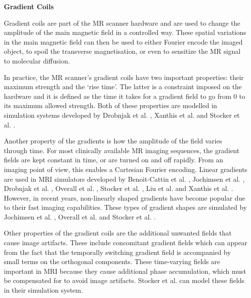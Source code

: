 \hfill

\large \textbf{Gradient Coils} \normalsize

Gradient coils are part of the MR scanner hardware and are used to change the amplitude of the main magnetic field in a controlled way.
These spatial variations in the main magnetic field can then be used 
to either Fourier encode the imaged object, 
to spoil the transverse magnetisation, or even
to sensitize the MR signal to molecular diffusion.

\hfill
    
In practice, the MR scanner's gradient coils have two important properties: their maximum strength and the `rise time'.
The latter is a constraint imposed on the hardware and it is defined as the time it takes for a gradient field to go from 0 to its maximum allowed strength.
Both of these properties are modelled in simulation systems developed by Drobnjak et al. \cite{Drobnjak2006}, Xanthis et al. \cite{Xanthis2014} and Stocker et al. \cite{Stocker2010}.

\hfill

Another property of the gradients is how the amplitude of the field varies through time.
For most clinically available MR imaging sequences, the gradient fields are kept constant in time, or are turned on and off rapidly.
From an imaging point of view, this enables a Cartesian Fourier encoding.
Linear gradients are used in MRI simulators developed by
Benoit-Cattin et al. \cite{Benoit-Cattin2005},
Jochimsen et al. \cite{Jochimsen2004},
Drobnjak et al. \cite{Drobnjak2006},
Overall et al. \cite{Overall2007},
Stocker et al. \cite{Stocker2010},
Liu et al. \cite{Liu2013} and 
Xanthis et al. \cite{Xanthis2014}.
However, in recent years, non-linearly shaped gradients have become popular due to their fast imaging capabilities.
These types of gradient shapes are simulated by 
Jochimsen et al. \cite{Jochimsen2004}, 
Overall et al. \cite{Overall2007} and
Stocker et al. \cite{Stocker2010}.

\hfill

Other properties of the gradient coils are the additional unwanted fields that cause image artifacts.
These include concomitant gradient fields which can appear from the fact that the temporally switching gradient field is accompanied by small terms on the orthogonal components.
These time-varying fields are important in MRI because they cause additional phase accumulation, which must be compensated for to avoid image artifacts.
Stocker et al. \cite{Stocker2010} can model these fields in their simulation system.

